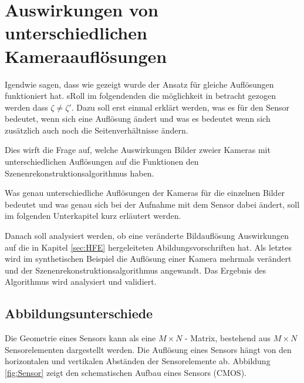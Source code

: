 \chapter{Auswirkungen von unterschiedlichen Kameraauflösungen}
\label{sec:minimalAuf} 



Igendwie sagen, dass wie gezeigt wurde der Ansatz für gleiche Auflösungen funktioniert hat. sRoll im folgendenden die möglichkeit in betracht gezogen werden dass $\zeta \neq \zeta'$. Dazu soll erst einmal erklärt werden, was es für den Sensor bedeutet, wenn sich eine Auflösung ändert und was es bedeutet wenn sich zusätzlich auch noch die Seitenverhältnisse ändern.


Dies wirft die Frage auf, welche Auswirkungen Bilder zweier Kameras mit unterschiedlichen Auflösungen auf die Funktionen den Szenenrekonstruktionsalgorithmus haben. 


Was genau unterschiedliche Auflösungen der Kameras für die einzelnen Bilder bedeutet und was genau sich bei der Aufnahme mit dem Sensor dabei ändert, soll im folgenden Unterkapitel kurz erläutert werden. 

Danach soll analysiert werden, ob eine veränderte Bildauflösung Auswirkungen auf die in Kapitel \ref{sec:HFE} hergeleiteten Abildungsvorschriften hat. Als letztes wird im synthetischen Beispiel die Auflösung einer Kamera mehrmals verändert und der Szenenrekonstruktionsalgorithmus angewandt. Das Ergebnis des Algorithmus wird analysiert und validiert. 


\section{Abbildungsunterschiede}


Die Geometrie eines Sensors kann als eine  $M \times N$ - Matrix, bestehend aus $M \times N$ Sensorelementen dargestellt werden\cite{Photonik}. Die Auflösung eines Sensors hängt von den horizontalen und vertikalen Abständen der Sensorelemente ab. Abbildung \ref{fig:Sensor} zeigt den schematischen Aufbau eines Sensors (CMOS). 

